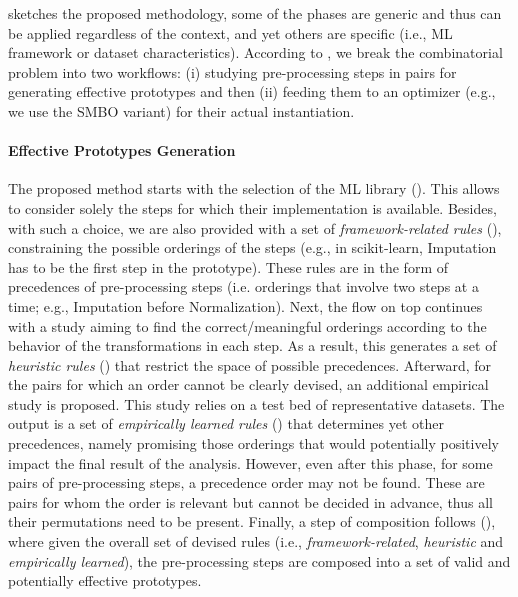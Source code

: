  sketches the proposed methodology, some of the phases are generic and thus can be applied regardless of the context, and yet others are specific (i.e., ML framework or dataset characteristics).
According to \cite{Quemy20InfSystems}, we break the combinatorial problem into two workflows: (i) studying pre-processing steps in pairs for generating effective prototypes and then (ii) feeding them to an optimizer (e.g., we use the SMBO \cite{HyperOptICML13} variant) for their actual instantiation.

\paragraph{Effective Prototypes Generation} The proposed method starts with the selection of the ML library ().
This allows to consider solely the steps for which their implementation is available.
Besides, with such a choice, we are also provided with a set of \textit{framework-related rules} (), constraining the possible orderings of the steps (e.g., in scikit-learn, Imputation has to be the first step in the prototype).
These rules are in the form of precedences of pre-processing steps (i.e. orderings that involve two steps at a time;  e.g., Imputation before Normalization).
Next, the flow on top continues with a study
aiming to find the correct/meaningful orderings according to
the behavior of the transformations in each step.
As a result, this generates a set of \textit{heuristic rules} () that restrict the space of possible precedences.
Afterward, for the pairs for which an order cannot be clearly devised, an additional empirical study is proposed.
This study relies on a test bed of representative datasets.
The output is a set of \textit{empirically learned rules} () that determines yet other precedences, namely promising those orderings that would potentially positively impact the final result of the analysis.
However, even after this phase, for some pairs of pre-processing steps, a precedence order may not be found.
These are pairs for whom the order is relevant but cannot be decided in advance, thus all their permutations need to be present.
Finally, a step of composition follows  (), where given the overall set of devised rules (i.e., \textit{framework-related}, \textit{heuristic} and \textit{empirically learned}), the pre-processing steps are composed into a set of valid and potentially effective prototypes.

